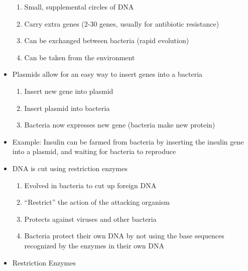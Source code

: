 \documentclass[12pt]{article}
\begin{document}
\begin{itemize}
\begin{enumerate}
      \item Small, supplemental circles of DNA

      \item Carry extra genes (2-30 genes, usually for antibiotic resistance)

      \item Can be exchanged between bacteria (rapid evolution)

      \item Can be taken from the environment

    \end{enumerate}

  \item Plasmids allow for an easy way to insert genes into a bacteria

    \begin{enumerate}

      \item Insert new gene into plasmid

      \item Insert plasmid into bacteria

      \item Bacteria now expresses new gene (bacteria make new protein)

    \end{enumerate}

  \item Example: Insulin can be farmed from bacteria by inserting the insulin gene into a plasmid, and waiting for bacteria to reproduce

  \item DNA is cut using restriction enzymes

    \begin{enumerate}

      \item Evolved in bacteria to cut up foreign DNA

      \item “Restrict” the action of the attacking organism

      \item Protects against viruses and other bacteria

      \item Bacteria protect their own DNA by not using the base sequences recognized by the enzymes in their own DNA

    \end{enumerate}

  \item Restriction Enzymes


\end{itemize}
\end{document}
